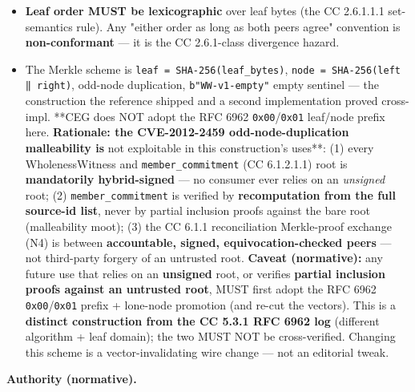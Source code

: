 \documentclass[11pt]{article}
\begin{document}
\begin{itemize}\setlength\itemsep{0pt}
\item \textbf{Leaf order MUST be lexicographic} over leaf bytes (the CC 2.6.1.1.1 set-semantics rule). Any "either order as long as both peers agree" convention is \textbf{non-conformant} — it is the CC 2.6.1-class divergence hazard.
\item The Merkle scheme is \texttt{leaf = SHA-256(leaf\_bytes)}, \texttt{node = SHA-256(left ‖ right)}, odd-node duplication, \texttt{b"WW-v1-empty"} empty sentinel — the construction the reference shipped and a second implementation proved cross-impl. **CEG does NOT adopt the RFC 6962 \texttt{0x00}/\texttt{0x01} leaf/node prefix here.\textbf{ Rationale: the CVE-2012-2459 odd-node-duplication malleability is }not exploitable in this construction's uses**: (1) every WholenessWitness and \texttt{member\_commitment} (CC 6.1.2.1.1) root is \textbf{mandatorily hybrid-signed} — no consumer ever relies on an \textit{unsigned} root; (2) \texttt{member\_commitment} is verified by \textbf{recomputation from the full source-id list}, never by partial inclusion proofs against the bare root (malleability moot); (3) the CC 6.1.1 reconciliation Merkle-proof exchange (N4) is between \textbf{accountable, signed, equivocation-checked peers} — not third-party forgery of an untrusted root. \textbf{Caveat (normative):} any future use that relies on an \textbf{unsigned} root, or verifies \textbf{partial inclusion proofs against an untrusted root}, MUST first adopt the RFC 6962 \texttt{0x00}/\texttt{0x01} prefix + lone-node promotion (and re-cut the vectors). This is a \textbf{distinct construction from the CC 5.3.1 RFC 6962 log} (different algorithm + leaf domain); the two MUST NOT be cross-verified. Changing this scheme is a vector-invalidating wire change — not an editorial tweak.
\end{itemize}


\textbf{Authority (normative).}
\end{document}

